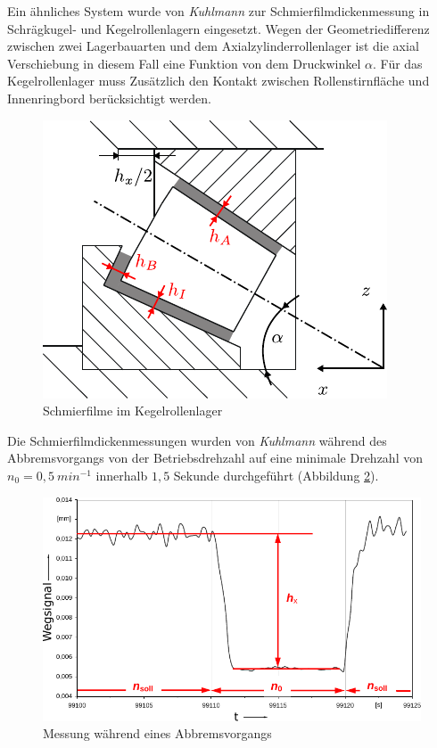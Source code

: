 Ein ähnliches System wurde von \textit{Kuhlmann} \cite{kuhlmann_2009} zur Schmierfilmdickenmessung in Schrägkugel- und Kegelrollenlagern eingesetzt.
Wegen der Geometriedifferenz zwischen zwei Lagerbauarten und dem Axialzylinderrollenlager ist die axial Verschiebung in diesem Fall eine Funktion von dem Druckwinkel $\alpha$.
Für das Kegelrollenlager muss Zusätzlich den Kontakt zwischen Rollenstirnfläche und Innenringbord berücksichtigt werden.
\begin{figure}[htb]
    \centering
    \includegraphics[]{./images/kerola_kuhlmann.pdf}
    \caption{Schmierfilme im Kegelrollenlager \cite{kuhlmann_2009}}
    \label{fig:kerola_kuhlmann}
\end{figure}
%

Die Schmierfilmdickenmessungen wurden von \textit{Kuhlmann} während des Abbremsvorgangs von der Betriebsdrehzahl auf eine minimale Drehzahl von $n_0 = 0,5 \ min^{-1}$ innerhalb $1,5$ Sekunde durchgeführt (Abbildung \ref{fig:differenzmessung_kuhlmann}).
\begin{figure}[htb]
    \centering
    \includegraphics[]{./images/differenzmessung_kuhlmann.pdf}
    \caption{Messung während eines Abbremsvorgangs \cite{kuhlmann_2009}}
    \label{fig:differenzmessung_kuhlmann}
\end{figure}
%

